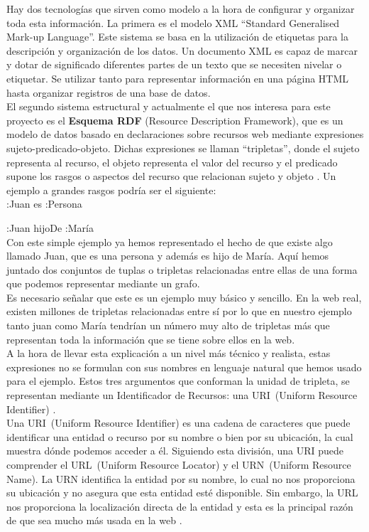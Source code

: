 Hay dos tecnologías que sirven como modelo a la hora de configurar y organizar toda esta información. La primera es el modelo XML ``Standard Generalised Mark-up Language''. Este sistema se basa en la utilización de etiquetas para la descripción y organización de los datos. Un documento XML es capaz de marcar y dotar de significado diferentes partes de un texto que se necesiten nivelar o etiquetar. Se utilizar tanto para representar información en una página HTML hasta organizar registros de una base de datos.\\

El segundo sistema estructural y actualmente el que nos interesa para este proyecto es el \textbf{Esquema RDF} (Resource Description Framework), que es un modelo de datos basado en declaraciones sobre recursos web mediante expresiones sujeto-predicado-objeto. Dichas expresiones se llaman ``tripletas'', donde el sujeto representa al recurso, el objeto representa el valor del recurso y el predicado supone los rasgos o aspectos del recurso que relacionan sujeto y objeto \cite{sakr2018}. Un ejemplo a grandes rasgos podría ser el siguiente:\\

:Juan es :Persona

:Juan hijoDe :María\\

Con este simple ejemplo ya hemos representado el hecho de que existe algo llamado Juan, que es una persona y además es hijo de María. Aquí hemos juntado dos conjuntos de tuplas o tripletas relacionadas entre ellas de una forma que podemos representar mediante un grafo.\\

Es necesario señalar que este es un ejemplo muy básico y sencillo. En la web real, existen millones de tripletas relacionadas entre sí por lo que en nuestro ejemplo tanto juan como María tendrían un número muy alto de tripletas más que representan toda la información que se tiene sobre ellos en la web.\\

A la hora de llevar esta explicación a un nivel más técnico y realista, estas expresiones no se formulan con sus nombres en lenguaje natural que hemos usado para el ejemplo. Estos tres argumentos que conforman la unidad de tripleta, se representan mediante un Identificador de Recursos: una URI~(Uniform Resource Identifier) \cite{sakr2018,berners1998}.\\

Una URI~(Uniform Resource Identifier) es una cadena de caracteres que puede identificar una entidad o recurso por su nombre o bien por su ubicación, la cual muestra dónde podemos acceder a él. Siguiendo esta división, una URI puede comprender el URL~(Uniform Resource Locator) y el URN~(Uniform Resource Name). La URN identifica la entidad por su nombre, lo cual no nos proporciona su ubicación y no asegura que esta entidad esté disponible. Sin embargo, la URL nos proporciona la localización directa de la entidad y esta es la principal razón de que sea mucho más usada en la web \cite{berners1994,saint2017,sakr2018}.\\

